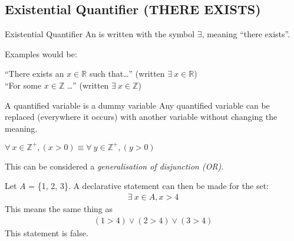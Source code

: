 \documentclass[\main/notes.tex]{subfiles}
\begin{document}
			\subsection[Existential Quantifier]{Existential Quantifier (THERE EXISTS)}
				\begin{definition}[width=0.85\textwidth]{Existential Quantifier}
					An  is written with the symbol $\exists $, meaning ``there exists''.
				\end{definition}
				\begin{example}[width=0.65\textwidth]
					Examples would be:
					\begin{indentparagraph}
						``There exists an $x \in \mathbb{R}$ such that\ldots'' (written $\exists \: x \in \mathbb{R}$)\\
						``For some $x \in \mathbb{Z}$ \ldots'' (written $\exists \: x \in \mathbb{Z}$)
					\end{indentparagraph}
				\end{example}
				\begin{sidenote}{A quantified variable is a dummy variable}
					Any quantified variable can be replaced (everywhere it occurs) with another variable without changing the meaning.
					\begin{example}[hbox]
						$\forall \: x \in \mathbb{Z}^{+}, (x > 0) \equiv \forall \: y \in \mathbb{Z}^{+}, (y > 0)$
					\end{example}
				\end{sidenote}
				This can be considered a \emph{generalisation of disjunction (OR)}.
				\begin{example}[width=0.9\textwidth]
					Let $A$ = \{1, 2, 3\}. A declarative statement can then be made for the set:
					\begin{align*}
						\exists \: x \in A, x > 4
					\end{align*}
					This means the same thing as 
					\begin{align*}
						(1 > 4) \lor (2 > 4) \lor (3 > 4)
					\end{align*}
					This statement is false.
				\end{example}
\end{document}
